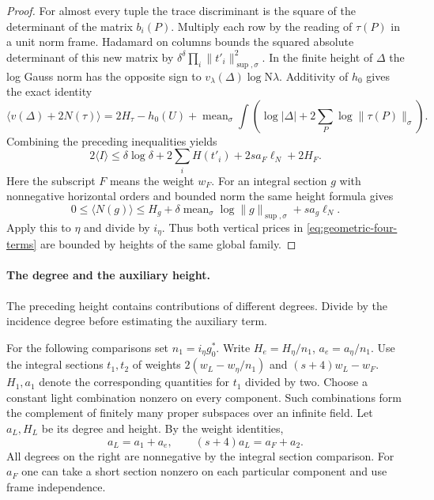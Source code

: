 \begin{proof}
For almost every tuple the trace discriminant is the square
of the determinant of the matrix \(b_i(P)\). Multiply each
row by the reading of \(\tau(P)\) in a unit norm frame.
Hadamard on columns bounds the squared absolute determinant
of this new matrix by \(\delta^\delta
\prod_i\|t'_i\|_{\sup,\sigma}^2\).
In the finite height of \(\Delta\) the log Gauss norm has the
opposite sign to \(v_\lambda(\Delta)\log\mathrm N\lambda\).
Additivity of \(h_0\) gives the exact identity
\[
 \langle v(\Delta)+2N(\tau)\rangle
 = 2H_\tau-h_0(U)
  +\operatorname{mean}_{\sigma}\int
       \left(\log|\Delta|+2\sum_P\log\|\tau(P)\|_\sigma\right).
\]
Combining the preceding inequalities yields
\begin{equation}\label{eq:slice-height-disc}
 2\langle I\rangle\le \delta\log\delta+2\sum_i H(t'_i)
                     +2s a_F\ell_N+2H_F .
\end{equation}
Here the subscript \(F\) means the weight \(w_F\).
For an integral section \(g\) with nonnegative horizontal
orders and bounded norm the same height formula gives
\[
 0\le\langle N(g)\rangle\le H_g+
    \delta\operatorname{mean}_\sigma\log\|g\|_{\sup,\sigma}
                       +s a_g\ell_N .
\]
Apply this to \(\eta\) and divide by \(i_\eta\).
Thus both vertical prices in \eqref{eq:geometric-four-terms}
are bounded by heights of the same global family.

\end{proof}

\paragraph{The degree and the auxiliary height.}

The preceding height contains contributions of different degrees. Divide by the incidence degree before estimating the auxiliary term.

For the following comparisons set \(n_1=i_\eta g_0^*\).
Write \(H_e=H_\eta/n_1\), \(a_e=a_\eta/n_1\).
Use the integral sections \(t_1,t_2\) of weights
\(2(w_L-w_\eta/n_1)\) and \((s+4)w_L-w_F\).
\(H_1,a_1\) denote the corresponding quantities for
\(t_1\) divided by two. Choose a constant light combination
nonzero on every component. Such combinations form the
complement of finitely many proper subspaces over an infinite
field. Let \(a_L,H_L\) be its degree and height.
By the weight identities,
\[
 a_L=a_1+a_e,\qquad (s+4)a_L=a_F+a_2 .
\]
All degrees on the right are nonnegative by the integral
section comparison. For \(a_F\) one can take a short
section nonzero on each particular component and use frame
independence.


